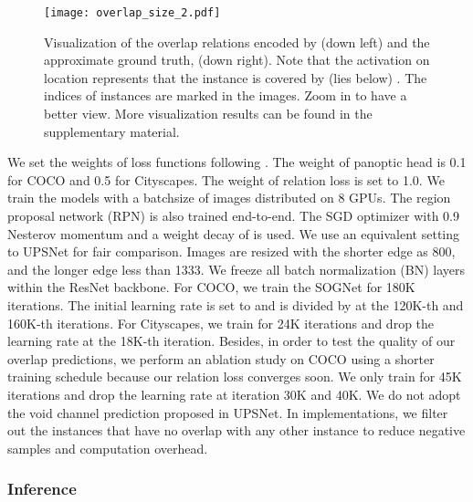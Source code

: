 \documentclass[letterpaper]{article} \usepackage{aaai20}  \usepackage{times}  \usepackage{helvet} \usepackage{courier}  \usepackage[hyphens]{url}  \usepackage{graphicx} \urlstyle{rm} \def\UrlFont{\rm}  \usepackage{graphicx}  \frenchspacing  \setlength{\pdfpagewidth}{8.5in}  \setlength{\pdfpageheight}{11in}
\begin{document}
\begin{figure*}[ht!]
	\centering
\texttt{[image: overlap\_size\_2.pdf]}
\vspace{-0.5mm}
	\caption{Visualization of the overlap relations encoded by  (down left) and the approximate ground truth,  (down right). Note that the activation on location  represents that the instance  is covered by (lies below) . The indices of instances are marked in the images. Zoom in to have a better view. More visualization results can be found in the supplementary material.}
	\label{overlap}
	\vspace{-1mm}
\end{figure*}



We set the weights of loss functions following \cite{xiong2019upsnet}. The weight of panoptic head is 0.1 for COCO and 0.5 for Cityscapes. The weight of relation loss is set to 1.0. We train the models with a batchsize of  images distributed on 8 GPUs. The region proposal network (RPN) is also trained end-to-end. The SGD optimizer with 0.9 Nesterov momentum and a weight decay of  is used. We use an equivalent setting to UPSNet for fair comparison. Images are resized with the shorter edge as 800, and the longer edge less than 1333. We freeze all batch normalization (BN) \cite{ioffe2015batch} layers within the ResNet backbone. For COCO, we train the SOGNet for 180K iterations. The initial learning rate is set to  and is divided by  at the 120K-th and 160K-th iterations. For Cityscapes, we train for 24K iterations and drop the learning rate at the 18K-th iteration. Besides, in order to test the quality of our overlap predictions, we perform an ablation study on COCO using a shorter training schedule because our relation loss converges soon. We only train for 45K iterations and drop the learning rate at iteration 30K and 40K. We do not adopt the void channel prediction proposed in UPSNet. In implementations, we filter out the instances that have no overlap with any other instance to reduce negative samples and computation overhead. 







\subsubsection{Inference}
\end{document}
